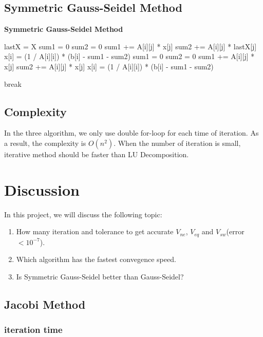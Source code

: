 \documentclass{article}
\begin{document}
\subsection{Symmetric Gauss-Seidel Method}
\begin{algorithm}[H]
    \caption{\textbf{Symmetric Gauss-Seidel Method}}
    \label{algo:sgs}
    \begin{algorithmic}
            \State lastX = X
                \State sum1 = 0
                \State sum2 = 0
                    \State sum1 += A[i][j] * x[j]
                \EndFor
                    \State sum2 += A[i][j] * lastX[j]
                \EndFor
                \State x[i] = (1 / A[i][i]) * (b[i] - sum1 - sum2)
            \EndFor
                \State sum1 = 0
                \State sum2 = 0
                    \State sum1 += A[i][j] * x[j]
                \EndFor
                    \State sum2 += A[i][j] * x[j]
                \EndFor
                \State x[i] = (1 / A[i][i]) * (b[i] - sum1 - sum2)
            \EndFor

                \State break
            \EndIf
        \EndFor
    \end{algorithmic}
\end{algorithm}

\subsection{Complexity}
\label{sec:complexity}
In the three algorithm, we only use double for-loop for each time of iteration. As a result, the complexity is $O(n^2)$. When the
number of iteration is small, iterative method should be faster than LU Decomposition.

\section{Discussion}
In this project, we will discuss the following topic:
\begin{enumerate}
    \item How many iteration and tolerance to get accurate $V_{ne}$, $V_{eq}$ and $V_{sw}$(error $< 10^{-7}$).
    \item Which algorithm has the fastest convegence speed.
    \item Is Symmetric Gauss-Seidel better than Gauss-Seidel?
\end{enumerate}

\subsection{Jacobi Method}
\subsubsection{iteration time}
\end{document}
